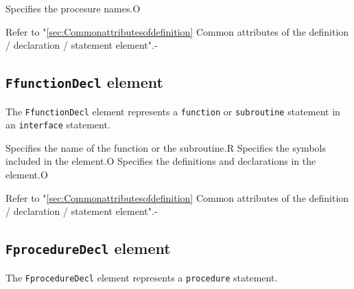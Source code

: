 \begin{XcodeMLChildElements}
{Specifies the procesure names.}{O}
\end{XcodeMLChildElements}

\begin{XcodeMLAttributes}
{Refer to "\ref{sec:Commonattributesofdefinition} Common attributes of the definition / declaration / statement element".}{-}
\end{XcodeMLAttributes}


\subsection{ {\tt FfunctionDecl} element}

The {\tt FfunctionDecl} element represents a {\tt function} or {\tt subroutine} statement in an {\tt interface} statement.


\begin{XcodeMLChildElements}
{Specifies the name of the function or the subroutine.}{R}
{Specifies the symbols included in the element.}{O}
{Specifies the definitions and declarations in the element.}{O}
\end{XcodeMLChildElements}

\begin{XcodeMLAttributes}
{Refer to "\ref{sec:Commonattributesofdefinition} Common attributes of the definition / declaration / statement element".}{-}
\end{XcodeMLAttributes}


\subsection{ {\tt FprocedureDecl} element}

The {\tt FprocedureDecl} element represents a {\tt procedure} statement.



